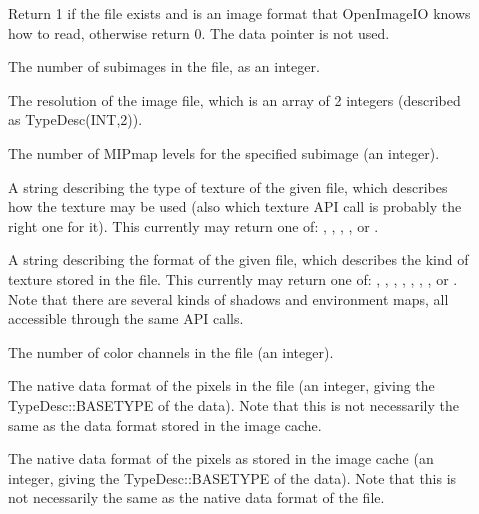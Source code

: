 \begin{description}
\item[\spc] \spc
\vspace{-12pt} 
\item[\rm {}] Return 1 if the file exists and
is an image format that OpenImageIO knows how to read, otherwise return
0.  The {\cf data} pointer is not used.

\item[\rm {}] The number of subimages in the file, as an integer.

\item[\rm {}] The resolution of the image file, which
is an array of 2 integers (described as {\cf TypeDesc(INT,2)}).

\item[\rm {}] The number of MIPmap levels for the specified
subimage (an integer).

\item[\rm {}] A string describing the type of texture
of the given file, which describes how the texture may be used (also
which texture API call is probably the right one for it).
This currently may return one of: , ,
, , 
or .

\item[\rm {}] A string describing the format of the
given file, which describes the kind of texture stored in the file.
This currently may return one of: , ,
, , , , , or .
Note that there are several kinds of shadows and environment maps,
all accessible through the same API calls.

\item[\rm {}] The number of color channels in the file 
(an integer).

\item[\rm {}] The native data format of the pixels in the
  file (an integer, giving the {\cf TypeDesc::BASETYPE} of the data).
  Note that this is not necessarily the same as the data format stored
  in the image cache.

\item[\rm {}] The native data format of the pixels as
  stored in the image cache (an integer, giving the {\cf
    TypeDesc::BASETYPE} of the data).  Note that this is not necessarily
  the same as the native data format of the file.


\end{description}

